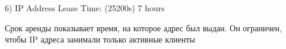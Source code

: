 \documentclass[a4paper,11pt]{article}
\begin{document}
\begin{center}
\label{fig:image}
\end{center}
6) IP Address Lease Time: (25200s) 7 hours

Срок аренды показывает время, на которое адрес был выдан. Он ограничен, чтобы IP адреса занимали только активные клиенты
\end{document}
